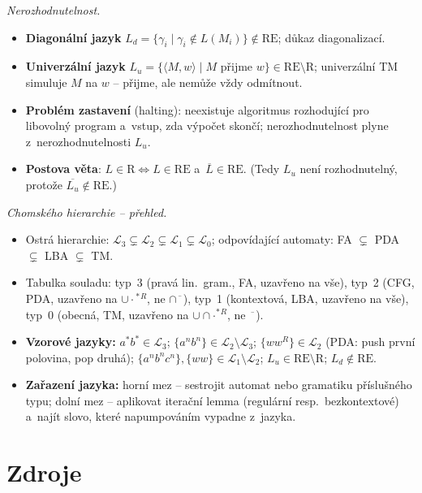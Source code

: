 \documentclass[11pt,a4paper]{article}
\begin{document}
\begin{poznamka}
\smallskip
\emph{Nerozhodnutelnost.}
\begin{itemize}
  \item \textbf{Diagonální jazyk} $L_d=\{\gamma_i\mid\gamma_i\notin L(M_i)\}\notin\mathrm{RE}$; důkaz diagonalizací.
  \item \textbf{Univerzální jazyk} $L_u=\{\langle M,w\rangle\mid M\text{ přijme }w\}\in\mathrm{RE}\setminus\mathrm R$; univerzální TM simuluje $M$ na $w$ -- přijme, ale nemůže vždy odmítnout.
  \item \textbf{Problém zastavení} (halting): neexistuje algoritmus rozhodující pro libovolný program a~vstup, zda výpočet skončí; nerozhodnutelnost plyne z~nerozhodnutelnosti $L_u$.
  \item \textbf{Postova věta}: $L\in\mathrm R\iff L\in\mathrm{RE}$ a~$\overline L\in\mathrm{RE}$. (Tedy $L_u$ není rozhodnutelný, protože $\overline{L_u}\notin\mathrm{RE}$.)
\end{itemize}

\smallskip
\emph{Chomského hierarchie -- přehled.}
\begin{itemize}
  \item Ostrá hierarchie: $\mathcal L_3\subsetneq\mathcal L_2\subsetneq\mathcal L_1\subsetneq\mathcal L_0$; odpovídající automaty: FA $\subsetneq$ PDA $\subsetneq$ LBA $\subsetneq$ TM.
  \item Tabulka souladu: typ~3 (pravá lin.\ gram., FA, uzavřeno na vše), typ~2 (CFG, PDA, uzavřeno na $\cup\cdot{}^*{}^R$, ne $\cap\overline{\phantom{x}}$), typ~1 (kontextová, LBA, uzavřeno na vše), typ~0 (obecná, TM, uzavřeno na $\cup\cap\cdot{}^*{}^R$, ne $\overline{\phantom{x}}$).
  \item \textbf{Vzorové jazyky:} $a^*b^*\in\mathcal L_3$; $\{a^nb^n\}\in\mathcal L_2\setminus\mathcal L_3$; $\{ww^R\}\in\mathcal L_2$ (PDA: push první polovina, pop druhá); $\{a^nb^nc^n\},\{ww\}\in\mathcal L_1\setminus\mathcal L_2$; $L_u\in\mathrm{RE}\setminus\mathrm R$; $L_d\notin\mathrm{RE}$.
  \item \textbf{Zařazení jazyka:} horní mez -- sestrojit automat nebo gramatiku příslušného typu; dolní mez -- aplikovat iterační lemma (regulární resp.\ bezkontextové) a~najít slovo, které napumpováním vypadne z~jazyka.
\end{itemize}
\end{poznamka}

\section*{Zdroje}
\end{document}
